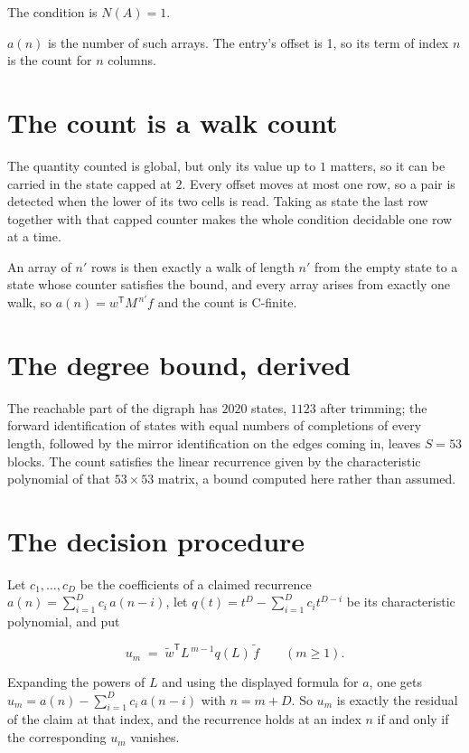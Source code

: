 \documentclass[11pt]{article}
\theoremstyle{definition}
\begin{document}
The condition is $N(A) = 1$.

$a(n)$ is the number of such arrays. The entry's offset is 1, so its term of index $n$ is the count for $n$ columns.

\section{The count is a walk count}

The quantity counted is global, but only its value up to $1$ matters, so it can be carried in the state capped at $2$. Every offset moves at most one row, so a pair is detected when the lower of its two cells is read. Taking as state the last row together with that capped counter makes the whole condition decidable one row at a time.

An array of $n'$ rows is then exactly a walk of length $n'$ from the empty state to a state whose counter satisfies the bound, and every array arises from exactly one walk, so $a(n) = w^{\mathsf T}M^{\,n'}f$ and the count is C-finite.

\section{The degree bound, derived}

The reachable part of the digraph has $2020$ states, $1123$ after trimming; the forward identification of states with equal numbers of completions of every length, followed by the mirror identification on the edges coming in, leaves $S = 53$ blocks. The count satisfies the linear recurrence given by the characteristic polynomial of that $53\times53$ matrix, a bound computed here rather than assumed.

\section{The decision procedure}

Let $c_1,\dots,c_D$ be the coefficients of a claimed recurrence $a(n) = \sum_{i=1}^{D} c_i\,a(n-i)$, let $q(t) = t^{D} - \sum_{i=1}^{D} c_i t^{D-i}$ be its characteristic polynomial, and put

\[u_m \;=\; \tilde w^{\mathsf T} L^{\,m-1} q(L)\,\tilde f \qquad (m \ge 1).\]

Expanding the powers of $L$ and using the displayed formula for $a$, one gets $u_m = a(n) - \sum_{i=1}^{D} c_i\,a(n-i)$ with $n = m + D$. So $u_m$ is exactly the residual of the claim at that index, and the recurrence holds at an index $n$ if and only if the corresponding $u_m$ vanishes.
\end{document}
